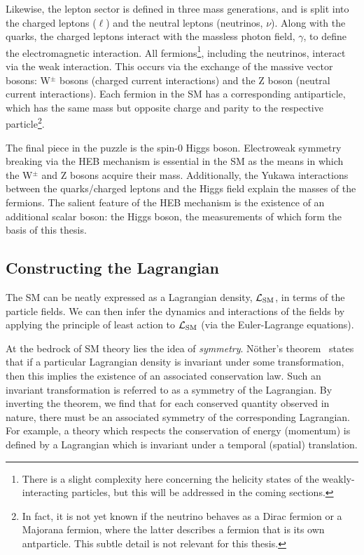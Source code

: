 Likewise, the lepton sector is defined in three mass generations, and is split into the charged leptons ($\ell$) and the neutral leptons (neutrinos, $\nu$). Along with the quarks, the charged leptons interact with the massless photon field, $\gamma$, to define the electromagnetic interaction. All fermions\footnote{There is a slight complexity here concerning the helicity states of the weakly-interacting particles, but this will be addressed in the coming sections.}, including the neutrinos, interact via the weak interaction. This occurs via the exchange of the massive vector bosons: W$^{\pm}$ bosons (charged current interactions) and the Z boson (neutral current interactions). Each fermion in the SM has a corresponding antiparticle, which has the same mass but opposite charge and parity to the respective particle\footnote{In fact, it is not yet known if the neutrino behaves as a Dirac fermion or a Majorana fermion, where the latter describes a fermion that is its own antparticle. This subtle detail is not relevant for this thesis.}.

The final piece in the puzzle is the spin-0 Higgs boson. Electroweak symmetry breaking via the HEB mechanism is essential in the SM as the means in which the W$^{\pm}$ and Z bosons acquire their mass. Additionally, the Yukawa interactions between the quarks/charged leptons and the Higgs field explain the masses of the fermions. The salient feature of the HEB mechanism is the existence of an additional scalar boson: the Higgs boson, the measurements of which form the basis of this thesis.

\subsection{Constructing the Lagrangian}\label{sec:theory_sm}
The SM can be neatly expressed as a Lagrangian density, $\mathcal{L}_{\rm{SM}}$, in terms of the particle fields. We can then infer the dynamics and interactions of the fields by applying the principle of least action to $\mathcal{L}_{\rm{SM}}$ (via the Euler-Lagrange equations). 

At the bedrock of SM theory lies the idea of \textit{symmetry}. N\"{o}ther's theorem~\cite{doi:10.1080_00411457108231446} states that if a particular Lagrangian density is invariant under some transformation, then this implies the existence of an associated conservation law. Such an invariant transformation is referred to as a symmetry of the Lagrangian. By inverting the theorem, we find that for each conserved quantity observed in nature, there must be an associated symmetry of the corresponding Lagrangian. For example, a theory which respects the conservation of energy (momentum) is defined by a Lagrangian which is invariant under a temporal (spatial) translation.

